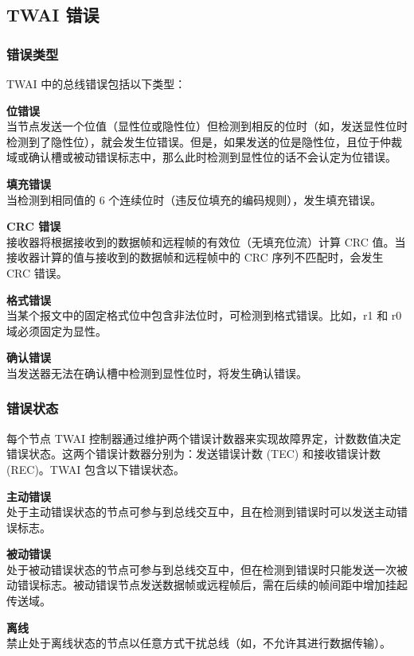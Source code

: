 \documentclass[main\_\_CN.tex]{subfiles}
\begin{document}


\subsection{TWAI 错误}
\label{sec:twai-errors}
\subsubsection{错误类型}

TWAI 中的总线错误包括以下类型：

{\bfseries 位错误}\\
当节点发送一个位值（显性位或隐性位）但检测到相反的位时（如，发送显性位时检测到了隐性位），就会发生位错误。但是，如果发送的位是隐性位，且位于仲裁域或确认槽或被动错误标志中，那么此时检测到显性位的话不会认定为位错误。

{\bfseries 填充错误}\\
当检测到相同值的 6 个连续位时（违反位填充的编码规则），发生填充错误。

{\bfseries CRC 错误}\\
接收器将根据接收到的数据帧和远程帧的有效位（无填充位流）计算 CRC 值。当接收器计算的值与接收到的数据帧和远程帧中的 CRC 序列不匹配时，会发生 CRC 错误。

{\bfseries 格式错误}\\
当某个报文中的固定格式位中包含非法位时，可检测到格式错误。比如，r1 和 r0 域必须固定为显性。

{\bfseries 确认错误}\\
当发送器无法在确认槽中检测到显性位时，将发生确认错误。

\subsubsection{错误状态}
每个节点 TWAI 控制器通过维护两个错误计数器来实现故障界定，计数数值决定错误状态。这两个错误计数器分别为：发送错误计数 (TEC) 和接收错误计数 (REC)。TWAI 包含以下错误状态。

{\bfseries 主动错误}\\
处于主动错误状态的节点可参与到总线交互中，且在检测到错误时可以发送主动错误标志。

{\bfseries 被动错误}\\
处于被动错误状态的节点可参与到总线交互中，但在检测到错误时只能发送一次被动错误标志。被动错误节点发送数据帧或远程帧后，需在后续的帧间距中增加挂起传送域。

{\bfseries 离线}\\
禁止处于离线状态的节点以任意方式干扰总线（如，不允许其进行数据传输）。
\end{document}
